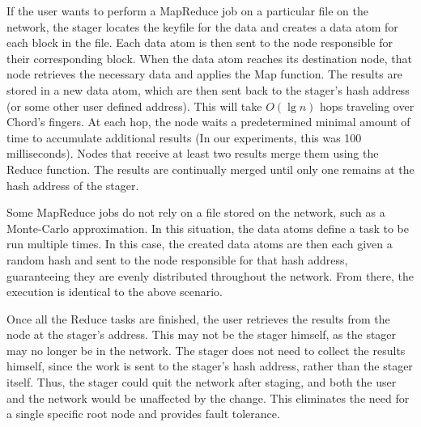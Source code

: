 If the user wants to perform a MapReduce job on a particular file on the network, the stager locates the keyfile for the data and creates a data atom for each block in the file.
Each data atom is then sent to the node responsible for their corresponding block.
When the data atom reaches its destination node, that node retrieves the necessary data and applies the Map function.
The results are stored in a new data atom,  which are then sent back to the stager's hash address (or some other user defined address).
This will take $O(\lg n)$ hops traveling over Chord's fingers.
At each hop, the node waits a predetermined minimal amount of time to accumulate additional results (In our experiments, this was 100 milliseconds).
Nodes that receive at least two results merge them using the Reduce function.
The results are continually merged until only one remains at the hash address of the stager.


Some MapReduce jobs do not rely on a file stored on the network, such as a Monte-Carlo approximation.
In this situation, the data atoms define a task to be run multiple times.
In this case, the created data atoms are then each given a random hash and sent to the node responsible for that hash address, guaranteeing they are evenly distributed throughout the network.
From there, the execution is identical to the above scenario.



Once all the Reduce tasks are finished, the user retrieves the results from the node at the stager's address.
This may not be the stager himself, as the stager may no longer be in the network.
The stager does not need to collect the results himself, since the work is sent to the stager's hash address, rather than the stager itself.
Thus, the stager could quit the network after staging, and both the user and the network would be unaffected by the change.
This eliminates the need for a single specific root node and provides fault tolerance.

